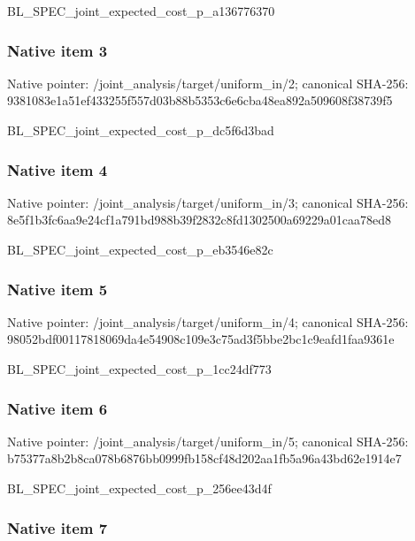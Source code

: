\documentclass[10pt,a4paper]{article}
\begin{document}
BL\_SPEC\_joint\_expected\_c\allowbreak{}ost\_p\_a136776370


\subsubsection{Native item 3}


Native pointer: /joint\_analysis/target/uniform\_in/2; canonical SHA-256: 9381083e1a51ef433255f557\allowbreak{}d03b88b5353c6e6cba48ea89\allowbreak{}2a509608f38739f5


BL\_SPEC\_joint\_expected\_c\allowbreak{}ost\_p\_dc5f6d3bad


\subsubsection{Native item 4}


Native pointer: /joint\_analysis/target/uniform\_in/3; canonical SHA-256: 8e5f1b3fc6aa9e24cf1a791b\allowbreak{}d988b39f2832c8fd1302500a\allowbreak{}69229a01caa78ed8


BL\_SPEC\_joint\_expected\_c\allowbreak{}ost\_p\_eb3546e82c


\subsubsection{Native item 5}


Native pointer: /joint\_analysis/target/uniform\_in/4; canonical SHA-256: 98052bdf00117818069da4e5\allowbreak{}4908c109e3c75ad3f5bbe2bc\allowbreak{}1c9eafd1faa9361e


BL\_SPEC\_joint\_expected\_c\allowbreak{}ost\_p\_1cc24df773


\subsubsection{Native item 6}


Native pointer: /joint\_analysis/target/uniform\_in/5; canonical SHA-256: b75377a8b2b8ca078b6876bb\allowbreak{}0999fb158cf48d202aa1fb5a\allowbreak{}96a43bd62e1914e7


BL\_SPEC\_joint\_expected\_c\allowbreak{}ost\_p\_256ee43d4f


\subsubsection{Native item 7}
\end{document}
